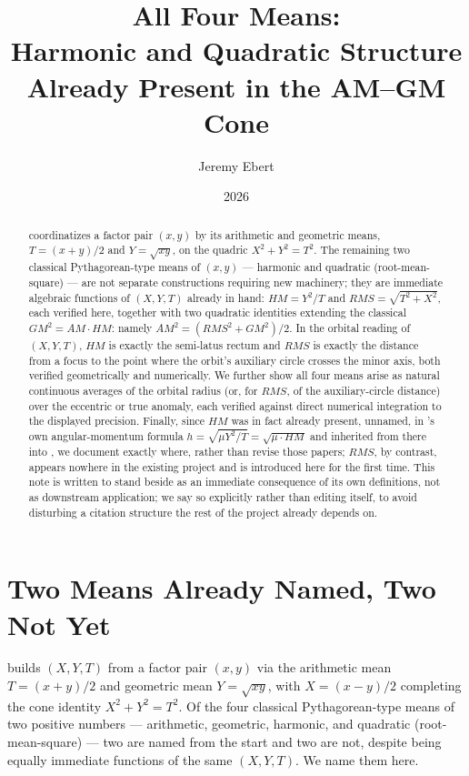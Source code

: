 \documentclass[12pt]{amsart}
\title[All Four Means]{All Four Means:\\
Harmonic and Quadratic Structure Already Present in the AM--GM Cone}
\author{Jeremy Ebert}
\date{2026}
\theoremstyle{plain}
\theoremstyle{remark}
\begin{document}
\maketitle

\begin{abstract}
\cite{Ebert2026Table} coordinatizes a factor pair $(x,y)$ by its arithmetic and geometric means, $T=(x+y)/2$ and $Y=\sqrt{xy}$, on the quadric $X^2+Y^2=T^2$. The remaining two classical Pythagorean-type means of $(x,y)$ --- harmonic and quadratic (root-mean-square) --- are not separate constructions requiring new machinery; they are immediate algebraic functions of $(X,Y,T)$ already in hand: $HM=Y^2/T$ and $RMS=\sqrt{T^2+X^2}$, each verified here, together with two quadratic identities extending the classical $GM^2=AM\cdot HM$: namely $AM^2=(RMS^2+GM^2)/2$. In the orbital reading of $(X,Y,T)$, $HM$ is exactly the semi-latus rectum and $RMS$ is exactly the distance from a focus to the point where the orbit's auxiliary circle crosses the minor axis, both verified geometrically and numerically. We further show all four means arise as natural continuous averages of the orbital radius (or, for $RMS$, of the auxiliary-circle distance) over the eccentric or true anomaly, each verified against direct numerical integration to the displayed precision. Finally, since $HM$ was in fact already present, unnamed, in \cite{Ebert2026Cone}'s own angular-momentum formula $h=\sqrt{\mu Y^2/T}=\sqrt{\mu\cdot HM}$ and inherited from there into \cite{Ebert2026Clock}, we document exactly where, rather than revise those papers; $RMS$, by contrast, appears nowhere in the existing project and is introduced here for the first time. This note is written to stand beside \cite{Ebert2026Table} as an immediate consequence of its own definitions, not as downstream application; we say so explicitly rather than editing \cite{Ebert2026Table} itself, to avoid disturbing a citation structure the rest of the project already depends on.
\end{abstract}

\section{Two Means Already Named, Two Not Yet}

\cite{Ebert2026Table} builds $(X,Y,T)$ from a factor pair $(x,y)$ via the arithmetic mean $T=(x+y)/2$ and geometric mean $Y=\sqrt{xy}$, with $X=(x-y)/2$ completing the cone identity $X^2+Y^2=T^2$. Of the four classical Pythagorean-type means of two positive numbers --- arithmetic, geometric, harmonic, and quadratic (root-mean-square) --- two are named from the start and two are not, despite being equally immediate functions of the same $(X,Y,T)$. We name them here.
\end{document}
